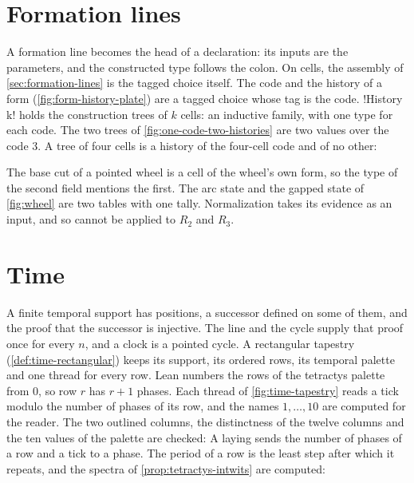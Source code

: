 \section*{Formation lines}
\label{sec:lean-formation}

A formation line becomes the head of a declaration: its inputs are the
parameters, and the constructed type follows the colon. On cells, the
assembly of \cref{sec:formation-lines} is the tagged choice itself. The code
and the history of a form (\cref{fig:form-history-plate}) are a tagged
choice whose tag is the code. \li!History k! holds the construction trees of
$k$ cells: an inductive family, with one type for each code. The two trees of
\cref{fig:one-code-two-histories} are two values over the code $3$.
A tree of four cells is a history of the four-cell code and of no other:

The base cut of a pointed wheel is a cell of the wheel's own form, so the
type of the second field mentions the first. The arc state and the gapped
state of \cref{fig:wheel} are two tables with one tally. Normalization takes
its evidence as an input, and so cannot be applied to $R_2$ and $R_3$.

\section*{Time}
\label{sec:lean-time}

A finite temporal support has positions, a successor defined on some of them,
and the proof that the successor is injective. The line and the cycle supply
that proof once for every $n$, and a clock is a pointed cycle.
A rectangular tapestry (\cref{def:time-rectangular}) keeps its support, its
ordered rows, its temporal palette and one thread for every row. Lean numbers
the rows of the tetractys palette from $0$, so row $r$ has $r+1$ phases. Each
thread of \cref{fig:time-tapestry} reads a tick modulo the number of phases
of its row, and the names $1,\ldots,10$ are computed for the reader. The two
outlined columns, the distinctness of the twelve columns and the ten values
of the palette are checked:
A laying sends the number of phases of a row and a tick to a phase. The
period of a row is the least step after which it repeats, and the spectra of
\cref{prop:tetractys-intwits} are computed:

